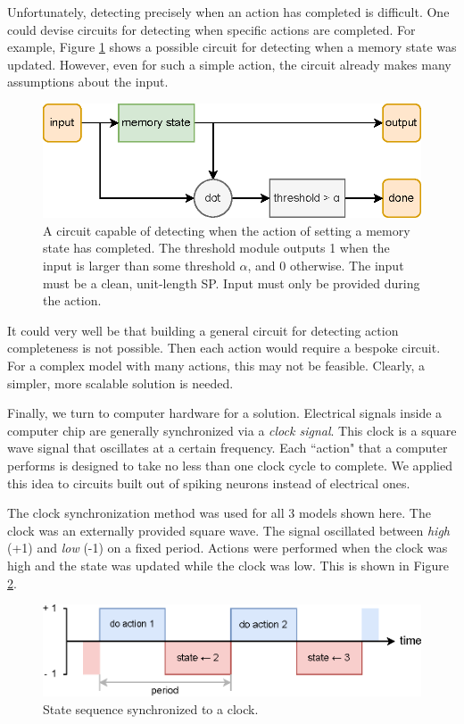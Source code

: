 \documentclass[10pt, a4paper, twocolumn]{article}
\begin{document}
Unfortunately, detecting precisely when an action has completed is difficult. One could devise circuits for detecting when specific actions are completed. For example, Figure \ref{fig:done-detector} shows a possible circuit for detecting when a memory state was updated. However, even for such a simple action, the circuit already makes many assumptions about the input. 

\begin{figure}[h]
	\centering
	\includegraphics[width=0.9\linewidth]{figures/done-detector.eps}
	\caption{A circuit capable of detecting when the action of setting a memory state has completed. The threshold module outputs 1 when the input is larger than some threshold $\alpha$, and 0 otherwise. The input must be a clean, unit-length SP. Input must only be provided during the action.}
	\label{fig:done-detector}
\end{figure}

It could very well be that building a general circuit for detecting action completeness is not possible. Then each action would require a bespoke circuit. For a complex model with many actions, this may not be feasible. Clearly, a simpler, more scalable solution is needed.

Finally, we turn to computer hardware for a solution. Electrical signals inside a computer chip are generally synchronized via a \emph{clock signal}. This clock is a square wave signal that oscillates at a certain frequency. Each ``action" that a computer performs is designed to take no less than one clock cycle to complete. We applied this idea to circuits built out of spiking neurons instead of electrical ones.

The clock synchronization method was used for all 3 models shown here. The clock was an externally provided square wave. The signal oscillated between \emph{high} (+1) and \emph{low} (-1) on a fixed period. Actions were performed when the clock was high and the state was updated while the clock was low. This is shown in Figure \ref{fig:clock}.

\begin{figure}[h]
	\centering
	\includegraphics[width=0.9\linewidth]{figures/clock.eps}
	\caption{State sequence synchronized to a clock.}
	\label{fig:clock}
\end{figure}
\end{document}

